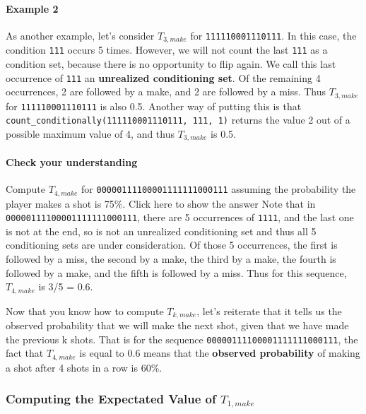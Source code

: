 \documentclass[11pt]{article}
\begin{document}
\paragraph{Example 2}\label{example-2}

As another example, let's consider \(T_{3, make}\) for
\texttt{111110001110111}. In this case, the condition \texttt{111}
occurs 5 times. However, we will not count the last \texttt{111} as a
condition set, because there is no opportunity to flip again. We call
this last occurrence of \texttt{111} an \textbf{unrealized conditioning
set}. Of the remaining 4 occurrences, 2 are followed by a make, and 2
are followed by a miss. Thus \(T_{3, make}\) for
\texttt{111110001110111} is also 0.5. Another way of putting this is
that
\texttt{count\_conditionally(\textquotesingle{}111110001110111\textquotesingle{},\ \textquotesingle{}111\textquotesingle{},\ \textquotesingle{}1\textquotesingle{})}
returns the value 2 out of a possible maximum value of 4, and thus
\(T_{3, make}\) is 0.5.

\paragraph{Check your understanding}\label{check-your-understanding}

Compute \(T_{4, make}\) for \texttt{00000111100001111111000111} assuming
the probability the player makes a shot is 75\%. Click here to show the
answer Note that in \texttt{00000111100001111111000111}, there are 5
occurrences of \texttt{1111}, and the last one is not at the end, so is
not an unrealized conditioning set and thus all 5 conditioning sets are
under consideration. Of those 5 occurrences, the first is followed by a
miss, the second by a make, the third by a make, the fourth is followed
by a make, and the fifth is followed by a miss. Thus for this sequence,
\(T_{4, make}\) is 3/5 = 0.6.

Now that you know how to compute \(T_{k, make}\), let's reiterate that
it tells us the observed probability that we will make the next shot,
given that we have made the previous k shots. That is for the sequence
\texttt{00000111100001111111000111}, the fact that \(T_{4, make}\) is
equal to 0.6 means that the \textbf{observed probability} of making a
shot after 4 shots in a row is 60\%.

\subsubsection{\texorpdfstring{Computing the Expectated Value of
\(T_{1, make}\)}{Computing the Expectated Value of T\_\{1, make\}}}\label{computing-the-expectated-value-of-t_1-make}
\end{document}
